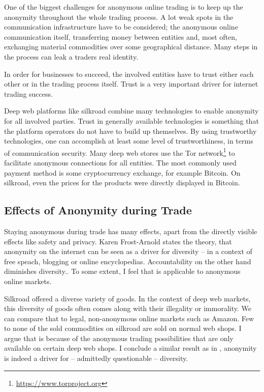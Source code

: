 One of the biggest challenges for anonymous online trading is to keep up the anonymity throughout the whole trading process. A lot weak spots in the communication infrastructure have to be considered; the anonymous online communication itself, transferring money between entities and, most often, exchanging material commodities over some geographical distance. Many steps in the process can leak a traders real identity.

In order for businesses to succeed, the involved entities have to trust either each other or in the trading process itself. Trust is a very important driver for internet trading success\cite{internetTrust2004}.

Deep web platforms like silkroad\cite{silkroad2013} combine many technologies to enable anonymity for all involved parties. Trust in generally available technologies is something that the platform operators do not have to build up themselves. By using trustworthy technologies, one can accomplish at least some level of trustworthiness, in terms of communication security. Many deep web stores use the Tor network\footnote{\url{https://www.torproject.org}} to facilitate anonymous connections for all entities\cite{silkroad2013}. The most commonly used payment method is some cryptocurrency exchange, for example Bitcoin. On silkroad, even the prices for the products were directly displayed in Bitcoin\cite{silkroad2013}.

\subsection{Effects of Anonymity during Trade}

Staying anonymous during trade has many effects, apart from the directly visible effects like safety and privacy. Karen Frost-Arnold states the theory, that anonymity on the internet can be seen as a driver for diversity -- in a context of free speach, blogging or online encyclopedias. Accountability on the other hand diminishes diversity.\cite{accountability2014}. To some extent, I feel that is applicable to anonymous online markets.

Silkroad offered a diverse variety of goods. In the context of deep web markets, this diversity of goods often comes along with their illegality or immorality\cite{silkroad2013}. We can compare that to legal, non-anonymous online markets such as Amazon. Few to none of the sold commodities on silkroad are sold on normal web shops. I argue that is because of the anonymous trading possibilities that are only available on certain deep web shops. I conclude a similar result as in \cite{accountability2014}, anonymity is indeed a driver for -- admittedly questionable -- diversity. 

